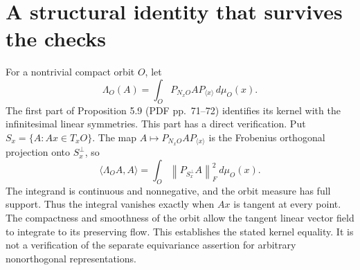 \documentclass[10pt]{article}
\begin{document}
\section*{A structural identity that survives the checks}
For a nontrivial compact orbit \(O\), let \[\Lambda_O(A)=\int_O P_{N_xO} A P_{\langle x\rangle}\,d\mu_O(x).\] The first part of Proposition 5.9 (PDF pp. 71–72) identifies its kernel with the infinitesimal linear symmetries. This part has a direct verification. Put \(S_x=\{A:Ax\in T_xO\}\). The map \(A\mapsto P_{N_xO}AP_{\langle x\rangle}\) is the Frobenius orthogonal projection onto \(S_x^\perp\), so \[\langle\Lambda_O A,A\rangle
   =\int_O\left\lVert P_{S_x^\perp}A\right\rVert_F^2\,d\mu_O(x).\] The integrand is continuous and nonnegative, and the orbit measure has full support. Thus the integral vanishes exactly when \(Ax\) is tangent at every point. The compactness and smoothness of the orbit allow the tangent linear vector field to integrate to its preserving flow. This establishes the stated kernel equality. It is not a verification of the separate equivariance assertion for arbitrary nonorthogonal representations.\par
\end{document}
